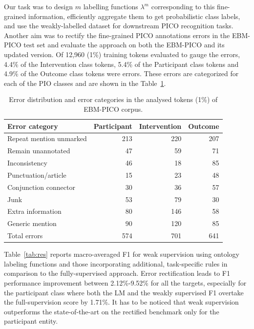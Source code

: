 \documentclass[10.7pt,]{article}
\begin{document}
%
%
%
Our task was to design $m$ labelling functions $\lambda^{m}$ corresponding to this fine-grained information, efficiently aggregate them to get probabilistic class labels, and use the weakly-labelled dataset for downstream PICO recognition tasks.
Another aim was to rectify the fine-grained PICO annotations errors in the EBM-PICO test set and evaluate the approach on both the EBM-PICO and its updated version.
%
Of 12,960 (1\%) training tokens evaluated to gauge the errors, 4.4\% of the Intervention class tokens, 5.4\% of the Participant class tokens and 4.9\% of the Outcome class tokens were errors.
These errors are categorized for each of the PIO classes and are shown in the Table~\ref{tab:errordist}.
%

\begin{table}[!ht]
    \centering
    \begin{tabular}{|l|r|r|r|}
    \hline
        Error category & Participant & Intervention & Outcome \\ \hline
        Repeat mention unmarked & 213 & 220 & 207 \\ 
        Remain unannotated & 47 & 59 & 71 \\ 
        Inconsistency & 46 & 18 & 85 \\ 
        Punctuation/article & 15 & 23 & 48 \\ 
        Conjunction connector & 30 & 36 & 57 \\ 
        Junk & 53 & 79 & 30 \\ 
        Extra information & 80 & 146 & 58 \\ 
        Generic mention & 90 & 120 & 85 \\ \hline
        Total errors & 574 & 701 & 641 \\ \hline
    \end{tabular}
    \caption{\label{tab:errordist} Error distribution and error categories in the analysed tokens (1\%) of EBM-PICO corpus.}
\end{table}
%
%
%
Table~\ref{tab:res} reports macro-averaged F1 for weak supervision using ontology labeling functions and those incorporating additional, task-specific rules in comparison to the fully-supervised approach.
Error rectification leads to F1 performance improvement between 2.12\%-9.52\% for all the targets, especially for the participant class where both the LM and the weakly supervised F1 overtake the full-supervision score by 1.71\%. It has to be noticed that weak supervision outperforms the state-of-the-art on the rectified benchmark only for the participant entity.
\end{document}
